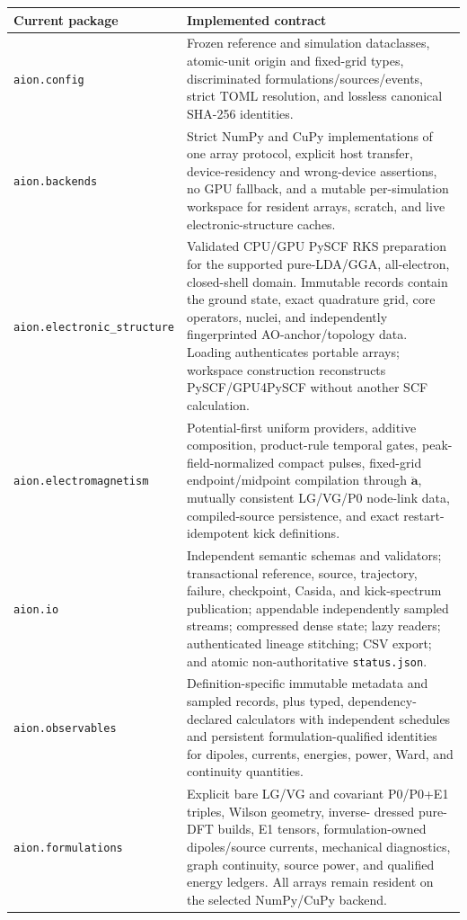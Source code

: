 \documentclass[11pt]{article}
\newcommand{\vect}[1]{\bm{#1}}
\newcommand{\code}[1]{\texttt{#1}}
\begin{document}
\begin{longtable}{@{}p{}p{}@{}}
\toprule
Current package & Implemented contract\\
\midrule
\endhead
\code{aion.config} &
Frozen reference and simulation dataclasses, atomic-unit origin and fixed-grid
types, discriminated formulations/sources/events, strict TOML resolution, and
lossless canonical SHA-256 identities.\\
\code{aion.backends} &
Strict NumPy and CuPy implementations of one array protocol, explicit host
transfer, device-residency and wrong-device assertions, no GPU fallback, and a
mutable per-simulation workspace for resident arrays, scratch, and live
electronic-structure caches.\\
\code{aion.electronic\_structure} &
Validated CPU/GPU PySCF RKS preparation for the supported pure-LDA/GGA,
all-electron, closed-shell domain. Immutable records contain the ground state,
exact quadrature grid, core operators, nuclei, and independently fingerprinted
AO-anchor/topology data. Loading authenticates portable arrays; workspace
construction reconstructs PySCF/GPU4PySCF without another SCF calculation.\\
\code{aion.electromagnetism} &
Potential-first uniform providers, additive composition, product-rule temporal
gates, peak-field-normalized compact pulses, fixed-grid endpoint/midpoint
compilation through \(\ddot{\vect a}\), mutually consistent LG/VG/P0 node-link
data, compiled-source persistence, and exact restart-idempotent kick
definitions.\\
\code{aion.io} &
Independent semantic schemas and validators; transactional reference, source,
trajectory, failure, checkpoint, Casida, and kick-spectrum publication;
appendable independently sampled streams; compressed dense state; lazy
readers; authenticated lineage stitching; CSV export; and atomic
non-authoritative \code{status.json}.\\
\code{aion.observables} &
Definition-specific immutable metadata and sampled records, plus typed,
dependency-declared calculators with independent schedules and persistent
formulation-qualified identities for dipoles, currents, energies, power,
Ward, and continuity quantities.\\
\code{aion.formulations} &
Explicit bare LG/VG and covariant P0/P0+E1 triples, Wilson geometry, inverse-
dressed pure-DFT builds, E1 tensors, formulation-owned dipoles/source currents,
mechanical diagnostics, graph continuity, source power, and qualified energy
ledgers. All arrays remain resident on the selected NumPy/CuPy backend.\\

\end{longtable}
\end{document}
